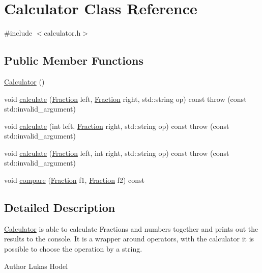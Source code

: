 \hypertarget{classCalculator}{\section{Calculator Class Reference}
\label{classCalculator}
}


{\ttfamily \#include $<$calculator.\-h$>$}

\subsection*{Public Member Functions}
\begin{DoxyCompactItemize}
\item 
\hyperlink{classCalculator_adf568b2e0dacc9adf5b7d740622beb92}{Calculator} ()
\item 
void \hyperlink{classCalculator_ad7c285bf5752406a7cb31e2d215785cc}{calculate} (\hyperlink{classFraction}{Fraction} left, \hyperlink{classFraction}{Fraction} right, std\-::string op) const   throw (const std\-::invalid\-\_\-argument)
\item 
void \hyperlink{classCalculator_aa1206e4ba90ec9b16996a7719a0b7a6b}{calculate} (int left, \hyperlink{classFraction}{Fraction} right, std\-::string op) const   throw (const std\-::invalid\-\_\-argument)
\item 
void \hyperlink{classCalculator_aab2a415730a7a9f0373bf4031fe48acc}{calculate} (\hyperlink{classFraction}{Fraction} left, int right, std\-::string op) const   throw (const std\-::invalid\-\_\-argument)
\item 
void \hyperlink{classCalculator_ab63c1adcd80233adf0c75b2fedbc9358}{compare} (\hyperlink{classFraction}{Fraction} f1, \hyperlink{classFraction}{Fraction} f2) const 
\end{DoxyCompactItemize}


\subsection{Detailed Description}
\hyperlink{classCalculator}{Calculator} is able to calculate Fractions and numbers together and prints out the results to the console. It is a wrapper around operators, with the calculator it is possible to choose the operation by a string.

\begin{DoxyAuthor}{Author}
Lukas Hodel 
\end{DoxyAuthor}


